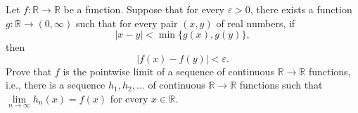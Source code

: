 \documentclass{article}
\begin{document}
\setlength{\parindent}{0pt}
Let \(\displaystyle f:\mathbb{R}\to\mathbb{R}\) be a function. Suppose that for every $\varepsilon>0$, there exists a function \(\displaystyle g:\mathbb{R}\to(0,\infty)\) such that for every pair \(\displaystyle (x,y)\) of real numbers, if$$|x-y|<\min\big\{g(x),g(y)\big\},$$then$$\big|f(x) - f(y)\big|<\varepsilon.$$Prove that \(\displaystyle f\) is the pointwise limit of a sequence of continuous \(\displaystyle \mathbb{R}\to\mathbb{R}\) functions, i.e., there is a sequence \(\displaystyle h_1,h_2,\ldots\) of continuous \(\displaystyle \mathbb{R}\to\mathbb{R}\) functions such that \(\displaystyle \lim\limits_{n\to\infty}h_n(x)=f(x)\) for every \(\displaystyle x\in\mathbb{R}\).
\end{document}
